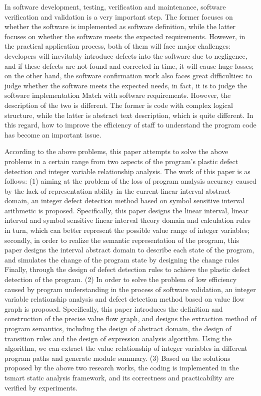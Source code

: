 \begin{abstract*}

In software development, testing, verification and maintenance, software verification and validation is a very important step. The former focuses on whether the software is implemented as software definition, while the latter focuses on whether the software meets the expected requirements. However, in the practical application process, both of them will face major challenges: developers will inevitably introduce defects into the software due to negligence, and if these defects are not found and corrected in time, it will cause huge losses; on the other hand, the software confirmation work also faces great difficulties: to judge whether the software meets the expected needs, in fact, it is to judge the software implementation Match with software requirements. However, the description of the two is different. The former is code with complex logical structure, while the latter is abstract text description, which is quite different. In this regard, how to improve the efficiency of staff to understand the program code has become an important issue.

According to the above problems, this paper attempts to solve the above problems in a certain range from two aspects of the program's plastic defect detection and integer variable relationship analysis. The work of this paper is as follows: (1) aiming at the problem of the loss of program analysis accuracy caused by the lack of representation ability in the current linear interval abstract domain, an integer defect detection method based on symbol sensitive interval arithmetic is proposed. Specifically, this paper designs the linear interval, linear interval and symbol sensitive linear interval theory domain and calculation rules in turn, which can better represent the possible value range of integer variables; secondly, in order to realize the semantic representation of the program, this paper designs the interval abstract domain to describe each state of the program, and simulates the change of the program state by designing the change rules Finally, through the design of defect detection rules to achieve the plastic defect detection of the program. (2) In order to solve the problem of low efficiency caused by program understanding in the process of software validation, an integer variable relationship analysis and defect detection method based on value flow graph is proposed. Specifically, this paper introduces the definition and construction of the precise value flow graph, and designs the extraction method of program semantics, including the design of abstract domain, the design of transition rules and the design of expression analysis algorithm. Using the algorithm, we can extract the value relationship of integer variables in different program paths and generate module summary. (3) Based on the solutions proposed by the above two research works, the coding is implemented in the tsmart static analysis framework, and its correctness and practicability are verified by experiments.


\end{abstract*}
